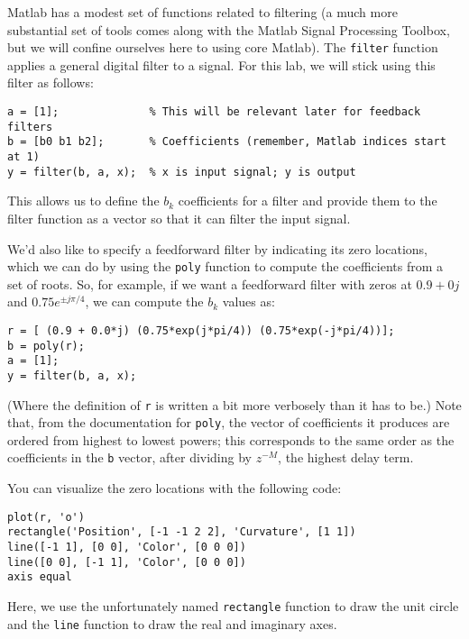 Matlab has a modest set of functions related to filtering (a much more
substantial set of tools comes along with the Matlab Signal Processing
Toolbox, but we will confine ourselves here to using core Matlab). The
\verb|filter| function applies a general digital filter to a
signal. For this lab, we will stick using this filter as follows:
\begin{lstlisting}[style=Matlab-editor,basicstyle=\mlttfamily\small]
a = [1];              % This will be relevant later for feedback filters
b = [b0 b1 b2];       % Coefficients (remember, Matlab indices start at 1)
y = filter(b, a, x);  % x is input signal; y is output
\end{lstlisting}
This allows us to define the $b_k$ coefficients for a filter and provide
them to the filter function as a vector so that it can filter the
input signal.

We'd also like to specify a feedforward filter by indicating its zero
locations, which we can do by using the \verb|poly| function to
compute the coefficients from a set of roots. So, for example, if we
want a feedforward filter with zeros at $0.9 + 0j$ and $0.75e^{\pm j
\pi/4}$, we can compute the $b_k$ values as:
\begin{lstlisting}[style=Matlab-editor,basicstyle=\mlttfamily\small]
r = [ (0.9 + 0.0*j) (0.75*exp(j*pi/4)) (0.75*exp(-j*pi/4))];
b = poly(r);
a = [1];
y = filter(b, a, x);
\end{lstlisting}
(Where the definition of \verb|r| is written a bit more verbosely than
it has to be.) Note that, from the documentation for \verb|poly|, the
vector of coefficients it produces are ordered from highest to lowest
powers; this corresponds to the same order as the coefficients in the
\verb|b| vector, after dividing by $z^{-M}$, the highest delay
term.

You can visualize the zero locations with the following code:
\begin{lstlisting}[style=Matlab-editor,basicstyle=\mlttfamily\small]
plot(r, 'o')
rectangle('Position', [-1 -1 2 2], 'Curvature', [1 1])
line([-1 1], [0 0], 'Color', [0 0 0])
line([0 0], [-1 1], 'Color', [0 0 0])
axis equal
\end{lstlisting}
Here, we use the unfortunately named \verb|rectangle| function
to draw the unit circle and the \verb|line| function to draw the real
and imaginary axes.

